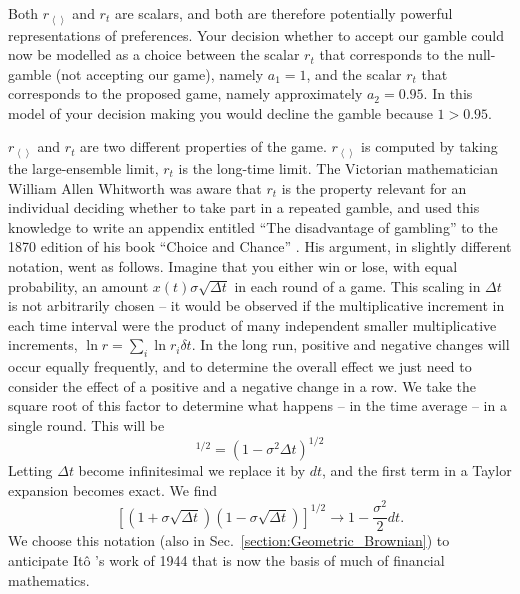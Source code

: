 \documentclass[a4paper]{article}
\newcommand{\Ito}{It\^{o} }
\newcommand{\ave}[1]{\left\langle#1 \right\rangle}
\newcommand{\rex}{r_{\ave{}}}
\newcommand{\rt}{r_{t}}
\newcommand{\secref}[1]{Sec.~\ref{section:#1}}
\newcommand{\be}{\begin{equation}}
\newcommand{\ee}{\end{equation}}
\begin{document}
Both $\rex$ and $\rt$ are scalars, and both are therefore potentially powerful 
representations of preferences. Your decision whether to accept our gamble could
now be modelled as a choice between the scalar $\rt$  that corresponds to the
null-gamble (not accepting our game), namely $a_1=1$, and the scalar $\rt$ that 
corresponds to the proposed game, namely approximately $a_2=0.95$. In this 
model of your decision making you would decline the gamble because $1>0.95$.

$\rex$ and $\rt$ are two different properties of the game. $\rex$ is computed 
by taking the large-ensemble limit, $\rt$ is the long-time limit. The Victorian 
mathematician William Allen Whitworth was aware that $\rt$ is the property 
relevant for an individual deciding whether to take part in a repeated gamble, 
and used this knowledge to write an appendix  entitled ``The disadvantage 
of gambling'' to the 1870 edition of his book ``Choice and Chance'' 
\cite{Whitworth1870}. His argument, in slightly different notation, went as 
follows. Imagine that you either win or lose, with equal probability, 
an amount $x(t) \sigma \sqrt{\Delta t}$ in each round of a game. This scaling in $\Delta t$
is not arbitrarily chosen -- it would be observed if the multiplicative increment in each time interval
were the product of many independent smaller multiplicative 
increments, $\ln r=\sum_i \ln r_i \delta t$. In the long run, positive and 
negative changes will occur equally frequently, and to determine
the overall effect we just need to consider the effect of a positive and a negative change
in a row. We take the square root of this factor to determine what happens -- in the time average 
-- in a single round. This will be 
\be
[(1+\sigma \sqrt{\Delta t})(1-\sigma \sqrt{\Delta t})]^{1/2}= (1-\sigma^2 \Delta t)^{1/2}
\ee
Letting $\Delta t$ become infinitesimal we replace it by $dt$, and 
the first term in a Taylor expansion becomes exact. We find
\be
\left[(1+\sigma \sqrt{\Delta t})(1-\sigma \sqrt{\Delta t})\right]^{1/2}\to 1-\frac{\sigma^2}{2} dt.
\ee
We choose this notation (also in \secref{Geometric_Brownian}) to anticipate \Ito's 
work of 1944 that is now the basis of much of financial mathematics.
\end{document}
